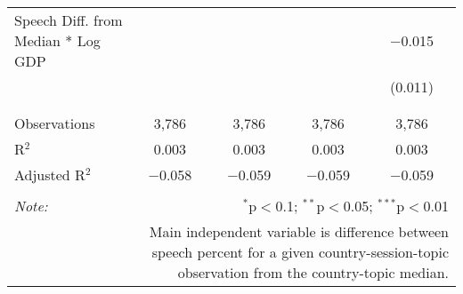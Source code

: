 \begin{table}[!htbp]
\begin{tabular}{@{\extracolsep{5pt}}lcccc}
 Speech Diff. from Median * Log GDP &  &  &  & $-$0.015 \\ 
  &  &  &  & (0.011) \\ 
  & & & & \\ 
\hline \\[-1.8ex] 
Observations & 3,786 & 3,786 & 3,786 & 3,786 \\ 
R$^{2}$ & 0.003 & 0.003 & 0.003 & 0.003 \\ 
Adjusted R$^{2}$ & $-$0.058 & $-$0.059 & $-$0.059 & $-$0.059 \\ 
\hline 
\hline \\[-1.8ex] 
\textit{Note:}  & \multicolumn{4}{r}{$^{*}$p$<$0.1; $^{**}$p$<$0.05; $^{***}$p$<$0.01} \\ 
 & \multicolumn{4}{r}{Main independent variable is difference between speech percent for a given country-session-topic observation from the country-topic median.} \\ 
\end{tabular} 
\end{table} 
